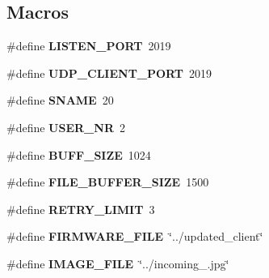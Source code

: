 \subsection*{Macros}
\begin{DoxyCompactItemize}
\item 
\#define \textbf{ L\+I\+S\+T\+E\+N\+\_\+\+P\+O\+RT}~2019
\item 
\#define \textbf{ U\+D\+P\+\_\+\+C\+L\+I\+E\+N\+T\+\_\+\+P\+O\+RT}~2019
\item 
\#define \textbf{ S\+N\+A\+ME}~20
\item 
\#define \textbf{ U\+S\+E\+R\+\_\+\+NR}~2
\item 
\#define \textbf{ B\+U\+F\+F\+\_\+\+S\+I\+ZE}~1024
\item 
\#define \textbf{ F\+I\+L\+E\+\_\+\+B\+U\+F\+F\+E\+R\+\_\+\+S\+I\+ZE}~1500
\item 
\#define \textbf{ R\+E\+T\+R\+Y\+\_\+\+L\+I\+M\+IT}~3
\item 
\#define \textbf{ F\+I\+R\+M\+W\+A\+R\+E\+\_\+\+F\+I\+LE}~\char`\"{}../updated\+\_\+client\char`\"{}
\item 
\#define \textbf{ I\+M\+A\+G\+E\+\_\+\+F\+I\+LE}~\char`\"{}../incoming\+\_.\+jpg\char`\"{}
\end{DoxyCompactItemize}
